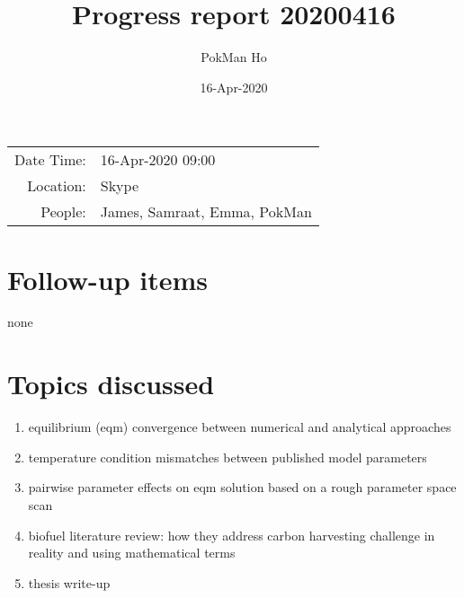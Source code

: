 \documentclass[a4paper,11pt]{article}
\title{Progress report 20200416}
\author{PokMan Ho}
\date{16-Apr-2020}
\begin{document}
    \maketitle
    
    \begin{tabular}{rl}
        Date Time: & 16-Apr-2020 09:00 \\
        Location: & Skype \\
        People: & James, Samraat, Emma, PokMan \\
    \end{tabular}
    
    \section{Follow-up items}
    none
    
    \section{Topics discussed}
    \begin{enumerate}
        \item equilibrium (eqm) convergence between numerical and analytical approaches
        \item temperature condition mismatches between published model parameters
        \item pairwise parameter effects on eqm solution based on a rough parameter space scan
        \item biofuel literature review: how they address carbon harvesting challenge in reality and using mathematical terms
        \item thesis write-up
    \end{enumerate}
    
\end{document}
